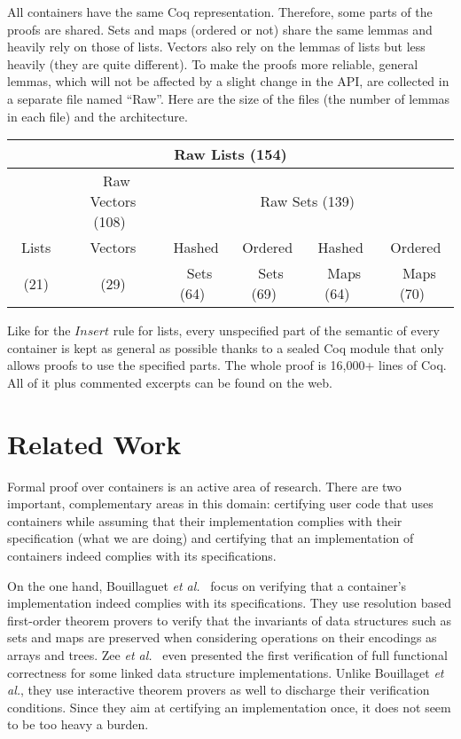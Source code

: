 \documentclass[runningheads,a4paper]{llncs}
\newcommand{\etal}{\textit{et al.}\xspace}
\newcommand{\Insert}{\ensuremath{\mathit{Insert}}\xspace}
\newcommand{\beforesec}{\vspace{-0.2cm}}
\newcommand{\aftersec}{\vspace{-0.2cm}}
\begin{document}
All containers have the same Coq representation. Therefore, some parts of the
proofs are shared. Sets and maps (ordered or not) share the same lemmas and
heavily rely on those of lists. Vectors also rely on the lemmas of lists but
less heavily (they are quite different).
To make the proofs more reliable, general lemmas, which will not be affected
by a slight change in the API, are collected in a separate file named ``Raw''.
%
Here are the size of the files
(the number of lemmas in each file) and the architecture.
\begin{center}
\begin{tabular}{|c|c|c|c|c|c|}
\hline
\multicolumn{6}{|c|}{Raw Lists (154)}\\
\hline
& ~Raw Vectors (108)~ & \multicolumn{4}{|c|}{Raw Sets (139)}\\
\cline{2-6}
~Lists~ & Vectors & Hashed & Ordered & Hashed & Ordered \\
(21) & (29) & ~Sets (64)~ & ~Sets (69)~ & ~Maps (64)~ & ~Maps (70)~\\
\hline
\end{tabular}
\end{center}
Like for the $\Insert$ rule for lists, every unspecified part of the semantic
of every container is kept as general as possible thanks to a sealed Coq module
that only allows proofs to use the specified parts. The whole proof is 16,000+
lines of Coq. All of it plus commented excerpts can be found
on the web.

\beforesec
\section{Related Work}
\label{sec:related-works}
\aftersec

Formal proof over containers is an active area of research.  There are two
important, complementary areas in this domain: certifying user code that uses
containers while assuming that their implementation complies with their
specification (what we are doing) and certifying that an implementation of
containers indeed complies with its specifications.

On the one hand, Bouillaguet \etal~\cite{bouillaguet:2007:vmcai} focus on
verifying that a container's implementation indeed complies with its
specifications. They use resolution based first-order theorem provers to verify
that the invariants of data structures such as sets and maps are preserved when
considering operations on their encodings as arrays and trees.  Zee
\etal~\cite{zee:2008:pldi} even presented the first verification of full
functional correctness for some linked data structure implementations. Unlike
Bouillaget \etal, they use interactive theorem provers as well to discharge
their verification conditions. Since they aim at certifying an implementation
once, it does not seem to be too heavy a burden.
\end{document}
